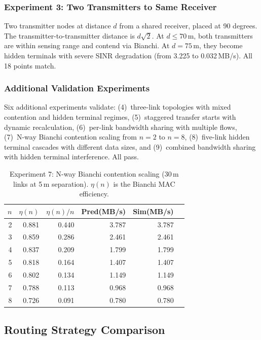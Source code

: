 \documentclass[conference]{IEEEtran}
\begin{document}
\subsubsection{Experiment 3: Two Transmitters to Same Receiver}

Two transmitter nodes at distance $d$ from a shared receiver, placed at 90
degrees.  The transmitter-to-transmitter distance is $d\sqrt{2}$.  At $d
\leq 70$\,m, both transmitters are within sensing range and contend via
Bianchi.  At $d = 75$\,m, they become hidden terminals with severe SINR
degradation (from 3.225 to 0.032\,MB/s).  All 18 points match.

\subsubsection{Additional Validation Experiments}

Six additional experiments validate: (4)~three-link topologies with mixed
contention and hidden terminal regimes, (5)~staggered transfer starts with
dynamic recalculation, (6)~per-link bandwidth sharing with multiple flows,
(7)~N-way Bianchi contention scaling from $n{=}2$ to $n{=}8$,
(8)~five-link hidden terminal cascades with different data sizes, and
(9)~combined bandwidth sharing with hidden terminal interference.  All pass.

\begin{table}[t]
\centering
\caption{Experiment 7: N-way Bianchi contention scaling (30\,m links at 5\,m
separation).  $\eta(n)$ is the Bianchi MAC efficiency.}
\label{tab:exp7}
\begin{tabular}{@{}rrrrrr@{}}
\toprule
$n$ & $\eta(n)$ & $\eta(n)/n$ & \textbf{Pred(MB/s)} & \textbf{Sim(MB/s)} \\
\midrule
2 & 0.881 & 0.440 & 3.787 & 3.787 \\
3 & 0.859 & 0.286 & 2.461 & 2.461 \\
4 & 0.837 & 0.209 & 1.799 & 1.799 \\
5 & 0.818 & 0.164 & 1.407 & 1.407 \\
6 & 0.802 & 0.134 & 1.149 & 1.149 \\
7 & 0.788 & 0.113 & 0.968 & 0.968 \\
8 & 0.726 & 0.091 & 0.780 & 0.780 \\
\bottomrule
\end{tabular}
\end{table}

\subsection{Routing Strategy Comparison}
\label{sec:routing_eval}
\end{document}
